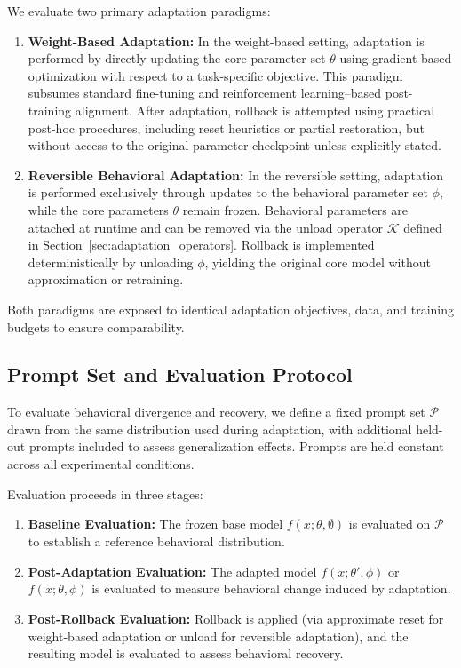 \documentclass{article}
\begin{document}
	We evaluate two primary adaptation paradigms:
	\begin{enumerate}
		\item \textbf{Weight-Based Adaptation:} In the weight-based setting, adaptation is performed by directly updating the core parameter set $\theta$ using gradient-based optimization with respect to a task-specific objective. This paradigm subsumes standard fine-tuning and reinforcement learning–based post-training alignment. After adaptation, rollback is attempted using practical post-hoc procedures, including reset heuristics or partial restoration, but without access to the original parameter checkpoint unless explicitly stated.
		\item \textbf{Reversible Behavioral Adaptation:} In the reversible setting, adaptation is performed exclusively through updates to the behavioral parameter set $\phi$, while the core parameters $\theta$ remain frozen. Behavioral parameters are attached at runtime and can be removed via the unload operator $\mathcal{K}$ defined in Section~\ref{sec:adaptation_operators}. Rollback is implemented deterministically by unloading $\phi$, yielding the original core model without approximation or retraining.
	\end{enumerate}
	
	Both paradigms are exposed to identical adaptation objectives, data, and training budgets to ensure comparability.
	
	
	\subsection{Prompt Set and Evaluation Protocol}
	\label{sec:ps_ep}
	
	To evaluate behavioral divergence and recovery, we define a fixed prompt set $\mathcal{P}$ drawn from the same distribution used during adaptation, with additional held-out prompts included to assess generalization effects. Prompts are held constant across all experimental conditions.
	
	Evaluation proceeds in three stages:
	\begin{enumerate}
		\item \textbf{Baseline Evaluation:} The frozen base model $f(x;\theta,\emptyset)$ is evaluated on $\mathcal{P}$ to establish a reference behavioral distribution.
		\item \textbf{Post-Adaptation Evaluation:} The adapted model $f(x;\theta',\phi)$ or $f(x;\theta,\phi)$ is evaluated to measure behavioral change induced by adaptation.
		\item \textbf{Post-Rollback Evaluation:} Rollback is applied (via approximate reset for weight-based adaptation or unload for reversible adaptation), and the resulting model is evaluated to assess behavioral recovery.
	\end{enumerate}
	
\end{document}
